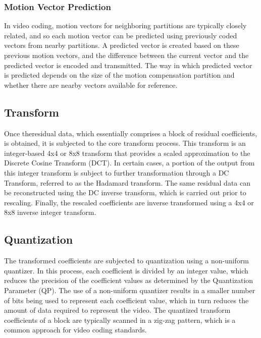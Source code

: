 \subsubsection{Motion Vector Prediction}
In video coding, motion vectors for neighboring partitions are typically closely related, and so each motion vector can be predicted using previously coded vectors from nearby partitions. A predicted vector is created based on these previous motion vectors, and the difference between the current vector and the predicted vector is encoded and transmitted. The way in which predicted vector is predicted depends on the size of the motion compensation partition and whether there are nearby vectors available for reference.

\subsection{Transform}
Once theresidual data, which essentially comprises a block of residual coefficients, is obtained, it is subjected to the core transform process. This transform is an integer-based 4x4 or 8x8 transform that provides a scaled approximation to the Discrete Cosine Transform (DCT). In certain cases, a portion of the output from this integer transform is subject to further transformation through a DC Transform, referred to as the Hadamard transform. The same residual data can be reconstructed using the DC inverse transform, which is carried out prior to rescaling. Finally, the rescaled coefficients are inverse transformed using a 4x4 or 8x8 inverse integer transform.

\subsection{Quantization}
The transformed coefficients are subjected to quantization using a non-uniform quantizer. In this process, each coefficient is divided by an integer value, which reduces the precision of the coefficient values as determined by the Quantization Parameter (QP). The use of a non-uniform quantizer results in a smaller number of bits being used to represent each coefficient value, which in turn reduces the amount of data required to represent the video. The quantized transform coefficients of a block are typically scanned in a zig-zag pattern, which is a common approach for video coding standards.

